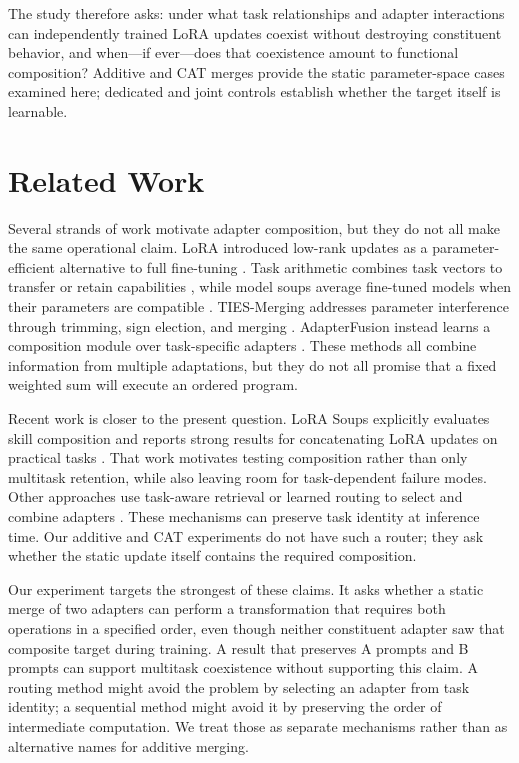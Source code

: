 \documentclass[10pt,twocolumn]{article}
\begin{document}
The study therefore asks: under what task relationships and adapter interactions can independently trained LoRA updates coexist without destroying constituent behavior, and when---if ever---does that coexistence amount to functional composition? Additive and CAT merges provide the static parameter-space cases examined here; dedicated and joint controls establish whether the target itself is learnable.

\section{Related Work}

Several strands of work motivate adapter composition, but they do not all make the same operational claim. LoRA introduced low-rank updates as a parameter-efficient alternative to full fine-tuning \citep{hu_lora}. Task arithmetic combines task vectors to transfer or retain capabilities \citep{ilharco_task_arithmetic}, while model soups average fine-tuned models when their parameters are compatible \citep{wortsman_soups}. TIES-Merging addresses parameter interference through trimming, sign election, and merging \citep{yadav_ties}. AdapterFusion instead learns a composition module over task-specific adapters \citep{pfeiffer_fusion}. These methods all combine information from multiple adaptations, but they do not all promise that a fixed weighted sum will execute an ordered program.

Recent work is closer to the present question. LoRA Soups explicitly evaluates skill composition and reports strong results for concatenating LoRA updates on practical tasks \citep{prabhakar_lora_soups}. That work motivates testing composition rather than only multitask retention, while also leaving room for task-dependent failure modes. Other approaches use task-aware retrieval or learned routing to select and combine adapters \citep{adsul_task_aware,dhasade_lorouter,shah_molora}. These mechanisms can preserve task identity at inference time. Our additive and CAT experiments do not have such a router; they ask whether the static update itself contains the required composition.

Our experiment targets the strongest of these claims. It asks whether a static merge of two adapters can perform a transformation that requires both operations in a specified order, even though neither constituent adapter saw that composite target during training. A result that preserves A prompts and B prompts can support multitask coexistence without supporting this claim. A routing method might avoid the problem by selecting an adapter from task identity; a sequential method might avoid it by preserving the order of intermediate computation. We treat those as separate mechanisms rather than as alternative names for additive merging.
\end{document}
